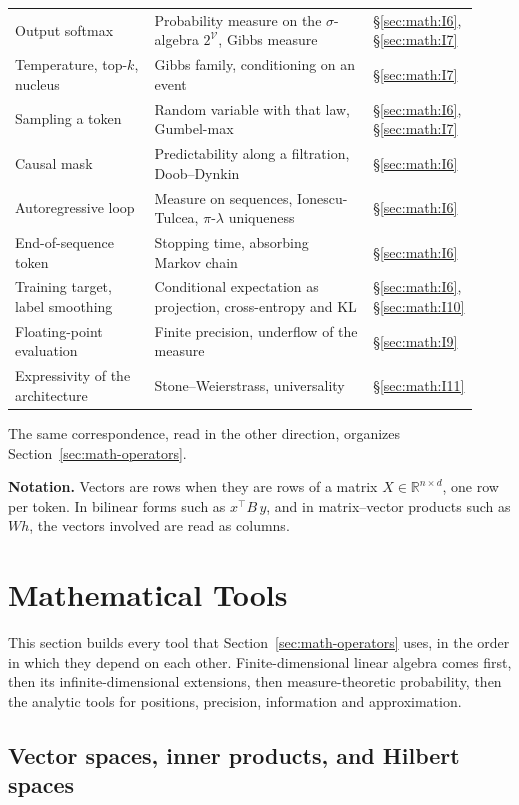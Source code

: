 \begin{longtable}{@{}p{0.30\linewidth}p{0.47\linewidth}p{0.15\linewidth}@{}}
Output softmax & Probability measure on the \(\sigma\)-algebra \(2^{\mathcal{V}}\), Gibbs measure & \S\ref{sec:math:I6}, \S\ref{sec:math:I7} \\
Temperature, top-\(k\), nucleus & Gibbs family, conditioning on an event & \S\ref{sec:math:I7} \\
Sampling a token & Random variable with that law, Gumbel-max & \S\ref{sec:math:I6}, \S\ref{sec:math:I7} \\
Causal mask & Predictability along a filtration, Doob--Dynkin & \S\ref{sec:math:I6} \\
Autoregressive loop & Measure on sequences, Ionescu-Tulcea, \(\pi\)-\(\lambda\) uniqueness & \S\ref{sec:math:I6} \\
End-of-sequence token & Stopping time, absorbing Markov chain & \S\ref{sec:math:I6} \\
Training target, label smoothing & Conditional expectation as projection, cross-entropy and KL & \S\ref{sec:math:I6}, \S\ref{sec:math:I10} \\
Floating-point evaluation & Finite precision, underflow of the measure & \S\ref{sec:math:I9} \\
Expressivity of the architecture & Stone--Weierstrass, universality & \S\ref{sec:math:I11} \\
\bottomrule
\end{longtable}

The same correspondence, read in the other direction, organizes Section~\ref{sec:math-operators}.

\textbf{Notation.} Vectors are rows when they are rows of a matrix
\(X \in \mathbb{R}^{n\times d}\), one row per token. In bilinear forms such as
\(x^{\top} B\, y\), and in matrix--vector products such as \(Wh\), the vectors involved
are read as columns.

\section{Mathematical Tools}\label{sec:math-tools}

This section builds every tool that Section~\ref{sec:math-operators} uses, in the order in which they
depend on each other. Finite-dimensional linear algebra comes first,
then its infinite-dimensional extensions, then measure-theoretic
probability, then the analytic tools for positions, precision,
information and approximation.

\subsection{Vector spaces, inner products, and Hilbert
spaces}\label{sec:math:I1}


